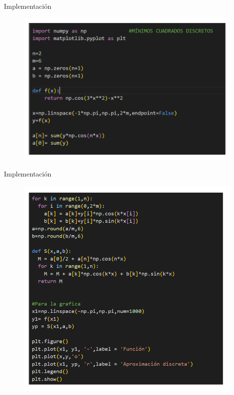 \begin{frame}{Implementación}
    \begin{figure}
        \centering
        \includegraphics[width=.85\paperwidth]{p7-code1.png}
        \caption*{}
    \end{figure}
\end{frame}

\begin{frame}{Implementación}
    \begin{figure}
        \centering
        \includegraphics[width=.58\paperwidth]{p7-code2.png}
        \caption*{}
    \end{figure}
\end{frame}

